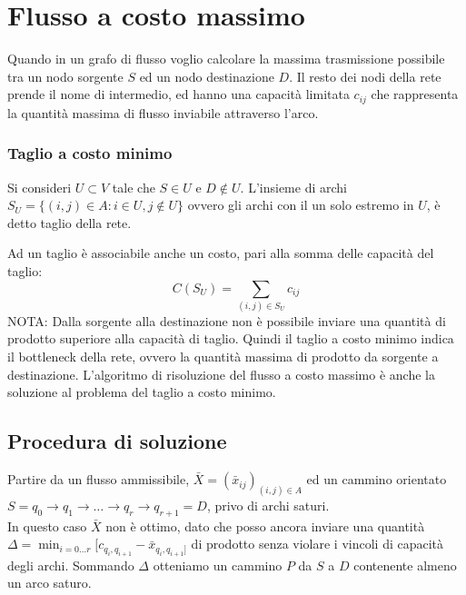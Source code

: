 \documentclass[../template]{subfiles}
\begin{document}
\section{Flusso a costo massimo}
\begin{center}
\end{center}
Quando in un grafo di flusso voglio calcolare la massima trasmissione possibile tra un nodo sorgente $S$ ed un nodo destinazione $D$.
Il resto dei nodi della rete prende il nome di intermedio, ed hanno una capacità limitata $c_{ij}$ che rappresenta la quantità massima
di flusso inviabile attraverso l'arco.
\subsubsection{Taglio a costo minimo}
Si consideri $U \subset V$ tale che $S \in U$ e  $D \notin U$.
L'insieme di archi $S_U = \{(i, j) \in A : i \in U, j \notin U\}$ ovvero gli archi con il un solo estremo in $U$, è
detto taglio della rete.

\vspace{10pt}
\noindent
Ad un taglio è associabile anche un costo, pari alla somma delle capacità del taglio:
\[
    C(S_U) = \sum_{(i, j) \in S_U} c_{ij}
\]
NOTA: Dalla sorgente alla destinazione non è possibile inviare una quantità di prodotto superiore alla capacità di taglio.
Quindi il taglio a costo minimo indica il bottleneck della rete, ovvero la quantità massima di prodotto da sorgente a destinazione.
L'algoritmo di risoluzione del flusso a costo massimo è anche la soluzione al problema del taglio a costo minimo.

\subsection{Procedura di soluzione}
Partire da un flusso ammissibile, $\bar{X} = (\bar{x}_{ij})_{(i, j) \in A}$ ed un cammino orientato $S = q_0 \to q_1 \to \dots \to q_{r} \to q_{r+1} = D$,
privo di archi saturi.
\\
In questo caso $\bar{X}$ non è ottimo, dato che posso ancora inviare una quantità $\Delta = \min_{i=0\dots r} [c_{q_i, q_{i+1}} - \bar{x}_{q_i, q_{i+1}]}$ di prodotto senza violare i vincoli di capacità degli archi.
Sommando $\Delta$ otteniamo un cammino $P$ da $S$ a $D$ contenente almeno un arco saturo.
\end{document}
